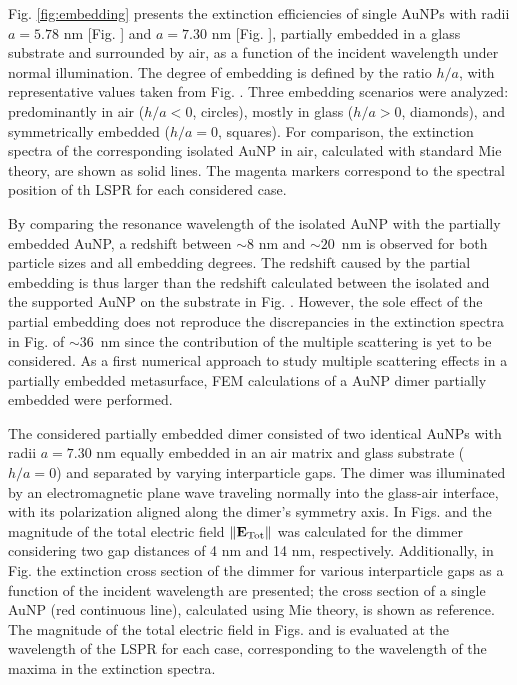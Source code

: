 Fig. \ref{fig:embedding} presents the extinction efficiencies of single AuNPs with radii  $a=5.78$ nm [Fig. ] and $a=7.30$ nm [Fig. ], partially embedded in a glass substrate and surrounded by air, as a function of the incident wavelength under normal illumination. The degree of embedding is defined by the ratio $h/a$, with representative values taken from Fig. . Three embedding scenarios were analyzed: predominantly in air ($h/a<0$, circles), mostly in glass ($h/a > 0$, diamonds), and symmetrically embedded ($h/a=0$, squares). For comparison, the extinction spectra of the corresponding isolated AuNP in air, calculated with standard Mie theory, are shown as solid lines. The magenta markers correspond to the spectral position of th LSPR for each considered case. 

By comparing the resonance wavelength of the isolated AuNP with the partially embedded AuNP, a redshift between $\sim  8$ nm  and $\sim  20$~nm is observed for both particle sizes and all embedding degrees. The redshift caused by the partial embedding is thus larger than the redshift calculated between the isolated and the supported AuNP on the substrate in Fig. . However, the sole effect of the partial embedding does not reproduce the discrepancies in the extinction spectra in Fig.  of $\sim  36$~nm since the contribution of the multiple scattering is yet to be considered. As a first numerical approach to study multiple scattering effects in a partially embedded metasurface, FEM calculations of a AuNP dimer partially embedded were performed.

The considered partially embedded dimer consisted of two identical AuNPs with radii $a = 7.30$ nm equally embedded in an air matrix and glass substrate ($h/a=0$) and separated by varying interparticle gaps. The dimer was illuminated by an electromagnetic plane wave traveling normally into the glass-air interface, with its polarization aligned along the dimer’s symmetry axis. In Figs.  and  the magnitude of the total electric field $\norm{\vb{E}_\text{Tot}}$ was calculated for the dimmer considering two gap distances of 4 nm and 14 nm, respectively. Additionally, in Fig.  the extinction cross section of the dimmer for various interparticle gaps as a function of the incident wavelength are presented; the cross section of a single AuNP (red continuous line), calculated using Mie theory, is shown as reference. The magnitude of the total electric field in Figs.  and  is evaluated at the wavelength of the LSPR for each case, corresponding to the wavelength of the maxima in the extinction spectra.

